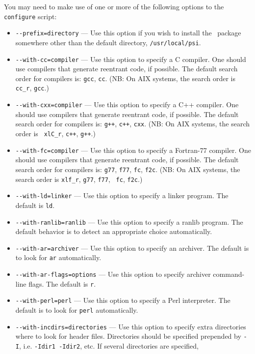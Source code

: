 \documentclass[12pt]{article}
\begin{document}
\noindent
You may need to make use of one or more of the following options to
the {\tt configure} script:
\begin{itemize}
\item {\tt -}{\tt -prefix=directory} --- Use this option if you wish to
  install the \PSIthree\ package somewhere other than the default
  directory, {\tt /usr/local/psi}.
\item {\tt -}{\tt -with-cc=compiler} --- Use this option to specify a C
  compiler.  One should use compilers that generate reentrant code,
  if possible. The default search order for compilers is: {\tt gcc},
  {\tt cc}.  (NB: On AIX systems, the search order is {\tt
  cc\_r}, {\tt gcc}.)
\item {\tt -}{\tt -with-cxx=compiler} --- Use this option to specify a C++
  compiler.  One should use compilers that generate reentrant code,
  if possible. The default search order for compilers is: {\tt g++},
  {\tt c++}, {\tt cxx}.  (NB: On AIX systems, the search order is {\tt
  xlC\_r}, {\tt c++}, {\tt g++}.)
\item {\tt -}{\tt -with-fc=compiler} --- Use this option to specify a
  Fortran-77 compiler.  One should use compilers that generate reentrant code,
  if possible. The default search order for compilers is:
  {\tt g77}, {\tt f77}, {\tt fc}, {\tt f2c}.  (NB: On AIX systems, the
  search order is {\tt xlf\_r}, {\tt g77}, {\tt f77}, {\tt
  fc}, {\tt f2c}.)
\item {\tt -}{\tt -with-ld=linker} --- Use this option to specify
  a linker program. The default is {\tt ld}.
\item {\tt -}{\tt -with-ranlib=ranlib} --- Use this option to specify
  a ranlib program. The default behavior is to detect an appropriate
  choice automatically.
\item {\tt -}{\tt -with-ar=archiver} --- Use this option to specify an
  archiver.  The default is to look for {\tt ar} automatically.
\item {\tt -}{\tt -with-ar-flags=options} --- Use this option to specify
  archiver command-line flags. The default is {\tt r}.
\item {\tt -}{\tt -with-perl=perl} --- Use this option to specify a
  Perl interpreter.  The default is to look for {\tt perl} automatically.
\item {\tt -}{\tt -with-incdirs=directories} --- Use this option to specify extra
  directories where to look for header files. Directories should be specified
  prepended by {\tt -I}, i.e. {\tt -Idir1 -Idir2}, etc. If several directories are specified,

\end{itemize}
\end{document}
